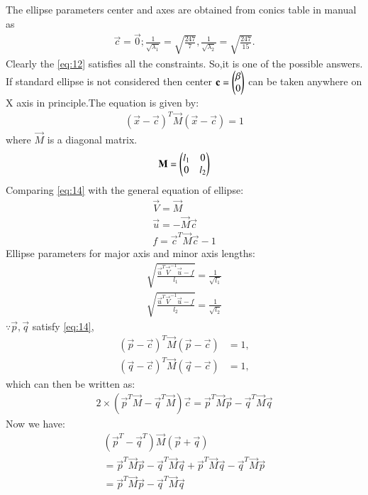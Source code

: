\documentclass[journal,12pt,twocolumn]{IEEEtran}
\begin{document}
The ellipse parameters center and axes are obtained from conics table in manual as
\begin{align}
\vec{c} = \vec{0};
\frac{1}{\sqrt{\lambda_1}}  = \sqrt{\frac{247}{7}},
\frac{1}{\sqrt{\lambda_2}}  = \sqrt{\frac{247}{15}}.
\end{align}
Clearly the \eqref{eq:12} satisfies all the constraints. So,it is one of the possible answers.
If standard ellipse is not considered then center $\mathbf{c}=\begin{pmatrix}\beta\\0\end{pmatrix}$ can be taken anywhere on X axis in principle.The equation is given by:
\begin{align}
(\vec{x}-\vec{c})^T\vec{M}(\vec{x}-\vec{c})=1\label{eq:14}
\end{align}
where $\vec{M}$ is a diagonal matrix.
\begin{align}
    \mathbf{M}=\begin{pmatrix}l_1&0\\0&l_2\end{pmatrix}
\end{align}
Comparing \eqref{eq:14} with the general equation of ellipse:
\begin{align}
    \vec{V}=\vec{M}\\
    \vec{u}=-\vec{M}\vec{c}\\
    f=\vec{c}^T\vec{M}\vec{c}-1
\end{align}
Ellipse parameters for major axis and minor axis lengths:
\begin{align}
    \sqrt{\frac{\vec{u}^T\vec{V}^{-1}\vec{u}-f}{l_1}}=\frac{1}{\sqrt{l_1}}\\
    \sqrt{\frac{\vec{u}^T\vec{V}^{-1}\vec{u}-f}{l_2}}=\frac{1}{\sqrt{l_2}}
\end{align}
$\because \vec{p}, \vec{q}$ satisfy \eqref{eq:14},
\begin{align}
\label{eq:ellipse_std_ab}
(\vec{p}-\vec{c})^T\vec{M}(\vec{p}-\vec{c}) &= 1,
\\
(\vec{q}-\vec{c})^T\vec{M}(\vec{q}-\vec{c}) &= 1,
\end{align}
which can then be written as:
\begin{align}
    2\times(\vec{p}^T\vec{M}-\vec{q}^T\vec{M})\vec{c}=\vec{p}^T\vec{M}\vec{p}-\vec{q}^T\vec{M}\vec{q}
\end{align}
Now we have:
\begin{align}
   (\vec{p}^T-\vec{q}^T)\vec{M}(\vec{p}+\vec{q})\\
   =\vec{p}^T\vec{M}\vec{p}-\vec{q}^T\vec{M}\vec{q}+\vec{p}^T\vec{M}\vec{q}-\vec{q}^T\vec{M}\vec{p}\\
   =\vec{p}^T\vec{M}\vec{p}-\vec{q}^T\vec{M}\vec{q}
\end{align}
\end{document}
